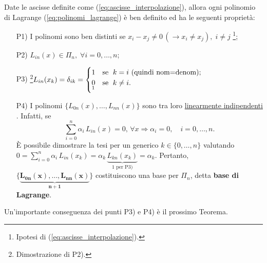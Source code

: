\begin{property}
	Date le ascisse definite come (\ref{eq:ascisse_interpolazione}), allora ogni polinomio di Lagrange (\ref{eq:polinomi_lagrange}) è \gls{ben definito} ed ha le seguenti proprietà:
	\begin{itemize}
		\item[P1)] I polinomi sono ben distinti se $x_i-x_j\neq 0\,(\rightarrow x_i\neq x_j),\; i\neq j$ \footnote{Ipotesi di (\ref{eq:ascisse_interpolazione}).};
		\item [P2)]\footnotemark $L_{in}(x)\in\Pi_n,\; \forall i=0,\hdots,n$;
		\item[P3)]\footnote{Dimostrazione di P2).}$L_{in}(x_k)=\delta_{ik}=
		\begin{cases}
			1 & \text{se $\;k=i$ (quindi nom=denom);}\\
			\underset{\footnotemark}{0} & \text{se $\;k\neq i$.}
		\end{cases}$
		\item[P4)] I polinomi $\{L_{0n}(x), \hdots, L_{nn}(x)\}$ sono tra loro \uline{linearmente indipendenti} \footnotemark.
		Infatti, se
		\begin{equation*}
			\sum_{i=0}^n \alpha_i\, L_{in}(x)=0, \, \forall x \Longrightarrow \alpha_i=0,\quad i=0,\hdots,n.
		\end{equation*}
		È possibile dimostrare la tesi per un generico $k\in \{0,\hdots,n\}$ valutando $0=\sum_{i=0}^n \alpha_i\, L_{in}(x_k)=\alpha_k\,\underbrace{L_{kn}(x_k)}_{1 \text{ per P3)}}=\alpha_k.$ Pertanto, $\boldsymbol{\{\underbrace{L_{0n}(x), \hdots,L_{nn}(x)}_{n+1}\}}$ costituiscono una base per $\Pi_n$, detta \textbf{base di Lagrange}.
	\end{itemize}
\end{property}

Un'importante conseguenza dei punti P3) e P4) è il prossimo Teorema.

